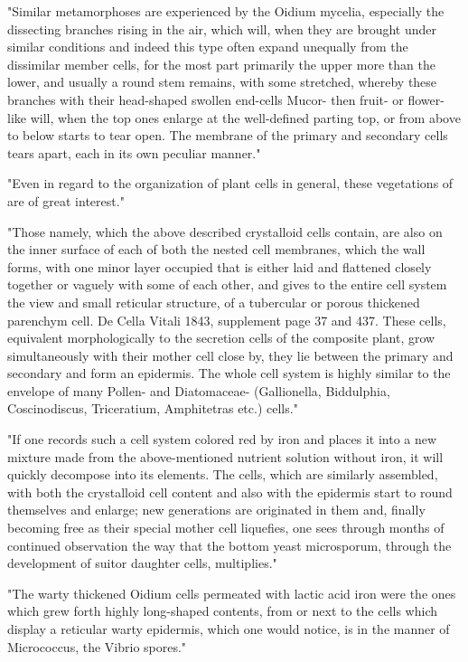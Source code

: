 \documentclass[a4paper, 12pt, oneside]{article}
\begin{document}
"Similar metamorphoses are experienced by the Oidium mycelia, especially the dissecting branches rising in the air, which will, when they are brought under similar conditions and indeed this type often expand unequally from the dissimilar member cells, for the most part primarily the upper more than the lower, and usually a round stem remains, with some stretched, whereby these branches with their head-shaped swollen end-cells Mucor- then fruit- or flower-like will, when the top ones enlarge at the well-defined parting top, or from above to below starts to tear open. The membrane of the primary and secondary cells tears apart, each in its own peculiar manner."

"Even in regard to the organization of plant cells in general, these vegetations of are of great interest."

"Those namely, which the above described crystalloid cells contain, are also on the inner surface of each of both the nested cell membranes, which the wall forms, with one minor layer occupied that is either laid and flattened closely together or vaguely with some of each other, and gives to the entire cell system the view and small reticular structure, of a tubercular or porous thickened parenchym cell. De Cella Vitali 1843, supplement page 37 and 437. These cells, equivalent morphologically to the secretion cells of the composite plant, grow simultaneously with their mother cell close by, they lie between the primary and secondary and form an epidermis. The whole cell system is highly similar to the envelope of many Pollen- and Diatomaceae- (Gallionella, Biddulphia, Coscinodiscus, Triceratium, Amphitetras etc.) cells."

"If one records such a cell system colored red by iron and places it into a new mixture made from the above-mentioned nutrient solution without iron, it will quickly decompose into its elements. The cells, which are similarly assembled, with both the crystalloid cell content and also with the epidermis start to round themselves and enlarge; new generations are originated in them and, finally becoming free as their special mother cell liquefies, one sees through months of continued observation the way that the bottom yeast microsporum, through the development of suitor daughter cells, multiplies."

"The warty thickened Oidium cells permeated with lactic acid iron were the ones which grew forth highly long-shaped contents, from or next to the cells which display a reticular warty epidermis, which one would notice, is in the manner of Micrococcus, the Vibrio spores."
\end{document}
